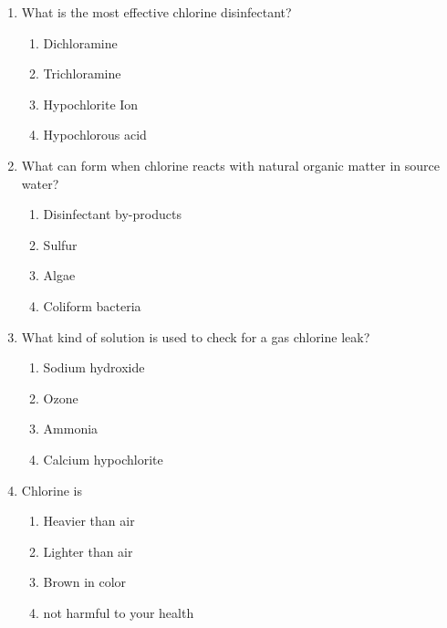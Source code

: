 \begin{enumerate}
\item  What is the most effective chlorine disinfectant?\\
\begin{enumerate}
\item Dichloramine\\
\item Trichloramine\\
\item Hypochlorite Ion\\
\item Hypochlorous acid
\end{enumerate} 

\item What can form when chlorine reacts with natural organic matter in source water?\\
\begin{enumerate}
\item Disinfectant by-products\\
\item Sulfur\\
\item Algae\\
\item Coliform bacteria
\end{enumerate}

\item  What kind of solution is used to check for a gas chlorine leak?\\
\begin{enumerate}
\item Sodium hydroxide\\
\item Ozone\\
\item Ammonia\\
\item Calcium hypochlorite
\end{enumerate}

\item  Chlorine is\\
\begin{enumerate}
\item Heavier than air\\
\item Lighter than air\\
\item Brown in color\\
\item not harmful to your health
\end{enumerate}


\end{enumerate}
